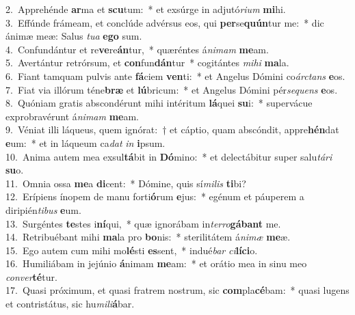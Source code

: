 {2.~}Apprehénde \textbf{ar}ma et \textbf{scu}tum:~* et exsúrge in adjutó\textit{ri}\textit{um} \textbf{mi}hi.\\
{3.~}Effúnde frámeam, et conclúde advérsus eos, qui \textbf{per}se\textbf{quún}tur me:~* dic ánimæ meæ: Salus \textit{tu}\textit{a} \textbf{e}\textbf{go} sum.\\
{4.~}Confundántur et re\textbf{ve}re\textbf{án}tur,~* quæréntes á\textit{ni}\textit{mam} \textbf{me}am.\\
{5.~}Avertántur retrórsum, et \textbf{con}fun\textbf{dán}tur~* cogitántes \textit{mi}\textit{hi} \textbf{ma}la.\\
{6.~}Fiant tamquam pulvis ante \textbf{fá}ciem \textbf{ven}ti:~* et Angelus Dómini co\textit{ár}\textit{ctans} \textbf{e}os.\\
{7.~}Fiat via illórum téne\textbf{bræ} et \textbf{lú}bricum:~* et Angelus Dómini pér\textit{se}\textit{quens} \textbf{e}os.\\
{8.~}Quóniam gratis abscondérunt mihi intéritum \textbf{lá}quei \textbf{su}i:~* supervácue exprobravérunt á\textit{ni}\textit{mam} \textbf{me}am.\\
{9.~}Véniat illi láqueus, quem ignórat:~† et cáptio, quam abscóndit, appre\textbf{hén}dat \textbf{e}um:~* et in láqueum ca\textit{dat} \textit{in} \textbf{i}psum.\\
{10.~}Anima autem mea exsul\textbf{tá}bit in \textbf{Dó}mino:~* et delectábitur super salu\textit{tá}\textit{ri} \textbf{su}o.\\
{11.~}Omnia ossa \textbf{me}a \textbf{di}cent:~* Dómine, quis sí\textit{mi}\textit{lis} \textbf{ti}bi?\\
{12.~}Erípiens ínopem de manu forti\textbf{ó}rum \textbf{e}jus:~* egénum et páuperem a diripién\textit{ti}\textit{bus} \textbf{e}um.\\
{13.~}Surgéntes \textbf{te}stes i\textbf{ní}qui,~* quæ ignorábam in\textit{ter}\textit{ro}\textbf{gá}\textbf{bant} me.\\
{14.~}Retribuébant mihi \textbf{ma}la pro \textbf{bo}nis:~* sterilitátem á\textit{ni}\textit{mæ} \textbf{me}æ.\\
{15.~}Ego autem cum mihi mo\textbf{lé}sti \textbf{es}sent,~* indué\textit{bar} \textit{ci}\textbf{lí}\textbf{ci}o.\\
{16.~}Humiliábam in jejúnio \textbf{á}nimam \textbf{me}am:~* et orátio mea in sinu meo \textit{con}\textit{ver}\textbf{té}tur.\\
{17.~}Quasi próximum, et quasi fratrem nostrum, sic \textbf{com}pla\textbf{cé}bam:~* quasi lugens et contristátus, sic hu\textit{mi}\textit{li}\textbf{á}bar.\\
